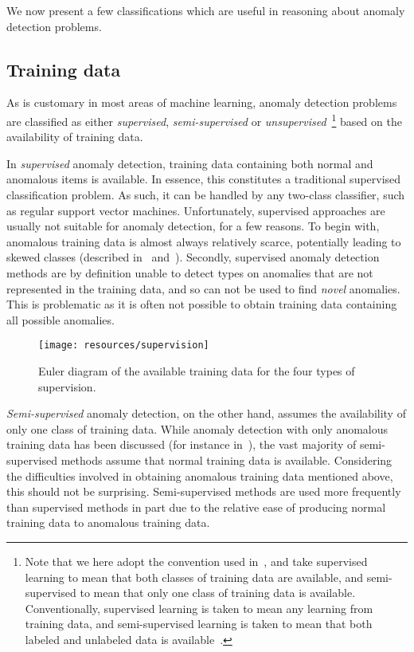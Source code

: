 We now present a few classifications which are useful in reasoning about anomaly detection problems.

\subsection{Training data}
\label{sect:training_data}

As is customary in most areas of machine learning, anomaly detection problems are classified as either \emph{supervised}, \emph{semi-supervised} or \emph{unsupervised}~\footnote{Note that we here adopt the convention used in~\cite{chandola}, and take supervised learning to mean that both classes of training data are available, and semi-supervised to mean that only one class of training data is available. Conventionally, supervised learning is taken to mean any learning from training data, and semi-supervised learning is taken to mean that both labeled and unlabeled data is available~\cite{TODO}.} based on the availability of training data.

In \emph{supervised} anomaly detection, training data containing both normal and anomalous items is available. In essence, this constitutes a traditional supervised classification problem. As such, it can be handled by any two-class classifier, such as regular support vector machines. Unfortunately, supervised approaches are usually not suitable for anomaly detection, for a few reasons. To begin with, anomalous training data is almost always relatively scarce, potentially leading to skewed classes (described in~\cite{phua} and~\cite{joshi}). Secondly, supervised anomaly detection methods are by definition unable to detect types on anomalies that are not represented in the training data, and so can not be used to find \emph{novel} anomalies. This is problematic as it is often not possible to obtain training data containing all possible anomalies.

\begin{wrapfigure}{o}{0.5\textwidth}
    \changecaptionwidth
    \centering
    \texttt{[image: resources/supervision]}
    \caption{Euler diagram of the available training data for the four types of supervision.}
\label{fig:supervision}
\end{wrapfigure}

\emph{Semi-supervised} anomaly detection, on the other hand, assumes the availability of only one class of training data. While anomaly detection with only anomalous training data has been discussed (for instance in~\cite{dasgupta}), the vast majority of semi-supervised methods assume that normal training data is available. Considering the difficulties involved in obtaining anomalous training data mentioned above, this should not be surprising. Semi-supervised methods are used more frequently than supervised methods in part due to the relative ease of producing normal training data to anomalous training data.

